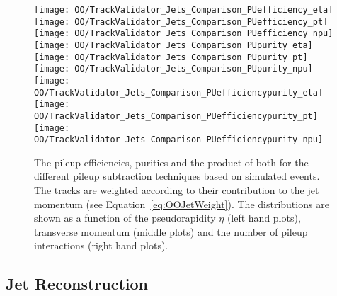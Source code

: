 \begin{figure}[h!t]
  \centering
  \texttt{[image: OO/TrackValidator\_Jets\_Comparison\_PUefficiency\_eta]}
  \texttt{[image: OO/TrackValidator\_Jets\_Comparison\_PUefficiency\_pt]}
  \texttt{[image: OO/TrackValidator\_Jets\_Comparison\_PUefficiency\_npu]}
  \\
  \texttt{[image: OO/TrackValidator\_Jets\_Comparison\_PUpurity\_eta]}
  \texttt{[image: OO/TrackValidator\_Jets\_Comparison\_PUpurity\_pt]}
  \texttt{[image: OO/TrackValidator\_Jets\_Comparison\_PUpurity\_npu]}
  \\
  \texttt{[image: OO/TrackValidator\_Jets\_Comparison\_PUefficiencypurity\_eta]}
  \texttt{[image: OO/TrackValidator\_Jets\_Comparison\_PUefficiencypurity\_pt]}
  \texttt{[image: OO/TrackValidator\_Jets\_Comparison\_PUefficiencypurity\_npu]}
  \caption[Pileup efficiencies, purities and their product for the different pileup subtraction techniques based on simulated \ttbar events with jet weight]{The pileup efficiencies, purities and the product of both for the different pileup subtraction techniques based on simulated \ttbar events. The tracks are weighted according to their contribution to the jet momentum (see Equation~\ref{eq:OOJetWeight}). The distributions are shown as a function of the pseudorapidity $\eta$ (left hand plots), transverse momentum (middle plots) and the number of pileup interactions (right hand plots). \label{plot:OOJetsTVCompTTPileup}}
\end{figure}



\subsection{Jet Reconstruction \label{sec:OOJetsPtResponse}}

